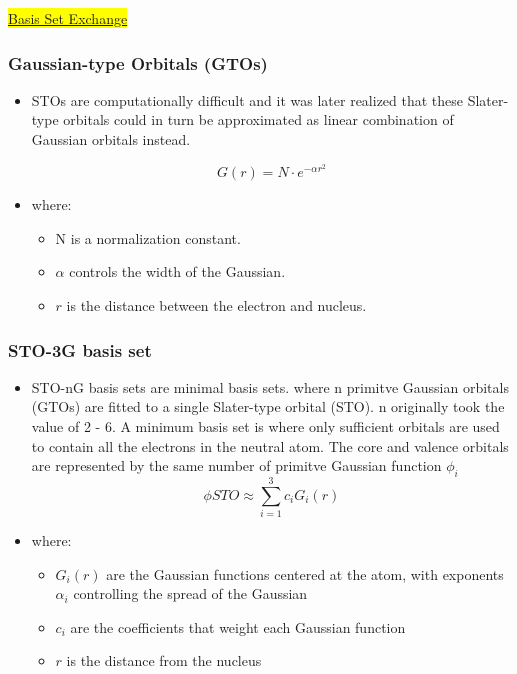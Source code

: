 \documentclass{article}
\begin{document}
\begin{itemize}
\href{https://www.basissetexchange.org/}{\colorbox{yellow}{Basis Set Exchange}}


\subsubsection*{Gaussian-type Orbitals (GTOs)}
\begin{itemize}
    \item STOs are computationally difficult and it was later realized that these Slater-type orbitals could in turn be approximated 
    as linear combination of Gaussian orbitals instead.
    
    \begin{equation}
        G(r) = N \cdot e^{-\alpha r^2}
    \end{equation}

    \item where:
    \begin{itemize}
        \item N is a normalization constant.
        \item \(\alpha\) controls the width of the Gaussian.
        \item \(r \) is the distance between the electron and nucleus.
    \end{itemize}
\end{itemize}

\subsubsection*{STO-3G basis set}
    \begin{itemize}
        \item STO-nG basis sets are minimal basis sets. where n primitve Gaussian orbitals (GTOs) are fitted to a single Slater-type orbital (STO).
        n originally took the value of 2 - 6. A minimum basis set is where only sufficient orbitals are used to contain all the electrons
        in the neutral atom. The core and valence orbitals are represented by the same number 
        of primitve Gaussian function \(\phi_i\)
        \begin{equation}
            \phi STO \approx \sum_{i=1}^{3} c_iG_i(r)
        \end{equation}
        \item where:
        \begin{itemize}
            \item \(G_i(r)\) are the Gaussian functions centered at the atom, with exponents \(\alpha_i\) controlling the spread of the Gaussian
            \item \(c_i\) are the coefficients that weight each Gaussian function
            \item \(r\) is the distance from the nucleus
        \end{itemize}
    \end{itemize}


\end{itemize}
\end{document}
